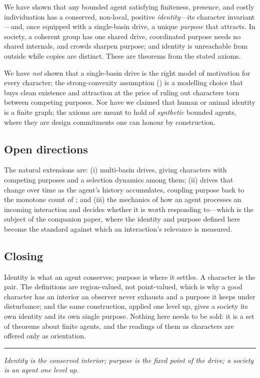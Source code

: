 \documentclass[11pt,twocolumn,a4paper]{article}
\begin{document}
We have shown that any bounded agent satisfying finiteness, presence, and
costly individuation has a conserved, non-local, positive
\emph{identity}---its character invariant---and, once equipped with a
single-basin drive, a unique \emph{purpose} that attracts. In society, a
coherent group has one shared drive, coordinated purpose needs no shared
internals, and crowds sharpen purpose; and identity is unreachable from
outside while copies are distinct. These are theorems from the stated
axioms.

We have \emph{not} shown that a single-basin drive is the right model of
motivation for every character; the strong-convexity assumption
() is a modelling choice that buys clean existence and
attraction at the price of ruling out characters torn between competing
purposes. Nor have we claimed that human or animal identity is a finite
graph; the axioms are meant to hold of \emph{synthetic} bounded agents,
where they are design commitments one can honour by construction.

\subsection{Open directions}

The natural extensions are: (i) multi-basin drives, giving characters with
competing purposes and a selection dynamics among them; (ii) drives that
change over time as the agent's history accumulates, coupling purpose back
to the monotone count of ; and (iii) the mechanics of
how an agent processes an incoming interaction and decides whether it is
worth responding to---which is the subject of the companion paper, where
the identity and purpose defined here become the standard against which an
interaction's relevance is measured.

\subsection{Closing}

Identity is what an agent conserves; purpose is where it settles. A
character is the pair. The definitions are region-valued, not
point-valued, which is why a good character has an interior an observer
never exhausts and a purpose it keeps under disturbance; and the same
construction, applied one level up, gives a society its own identity and
its own single purpose. Nothing here needs to be sold: it is a set of
theorems about finite agents, and the readings of them as characters are
offered only as orientation.

\vspace{0.6em}
\hrule
\vspace{0.4em}
\noindent\emph{Identity is the conserved interior; purpose is the fixed
point of the drive; a society is an agent one level up.}



\end{document}
